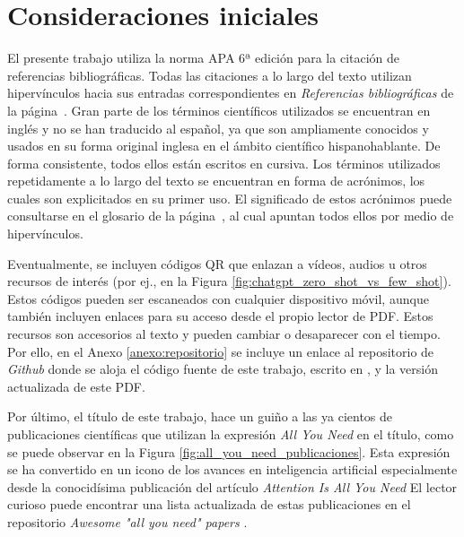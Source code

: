 \section{Consideraciones iniciales}

El presente trabajo utiliza la norma APA 6ª edición para la citación de referencias bibliográficas. Todas las citaciones a lo largo del texto utilizan hipervínculos hacia sus entradas correspondientes en \emph{Referencias bibliográficas} de la página~\pageref{chap:referencias}. Gran parte de los términos científicos utilizados se encuentran en inglés y no se han traducido al español, ya que son ampliamente conocidos y usados en su forma original inglesa en el ámbito científico hispanohablante. De forma consistente, todos ellos están escritos en cursiva. Los términos utilizados repetidamente a lo largo del texto se encuentran en forma de acrónimos, los cuales son explicitados en su primer uso. El significado de estos acrónimos puede consultarse en el glosario de la página~\pageref{chap:glosario}, al cual apuntan todos ellos por medio de hipervínculos.

Eventualmente, se incluyen códigos QR que enlazan a vídeos, audios u otros recursos de interés (por ej., en la Figura \ref{fig:chatgpt_zero_shot_vs_few_shot}). Estos códigos pueden ser escaneados con cualquier dispositivo móvil, aunque también incluyen enlaces para su acceso desde el propio lector de PDF. Estos recursos son accesorios al texto y pueden cambiar o desaparecer con el tiempo. Por ello, en el Anexo \ref{anexo:repositorio} se incluye un enlace al repositorio de \emph{Github} donde se aloja el código fuente de este trabajo, escrito en , y la versión actualizada de este PDF.

Por último, el título de este trabajo, hace un guiño a las ya cientos de publicaciones científicas que utilizan la expresión \emph{All You Need} en el título, como se puede observar en la Figura \ref{fig:all_you_need_publicaciones}. Esta expresión se ha convertido en un icono de los avances en inteligencia artificial especialmente desde la conocidísima publicación del artículo \emph{Attention Is All You Need} \citep{vaswaniAttentionAllYou2017} El lector curioso puede encontrar una lista actualizada de estas publicaciones en el repositorio \emph{Awesome "all you need" papers} \citep{nishiKentoNishiAwesomeallyouneedpapers2024}.


